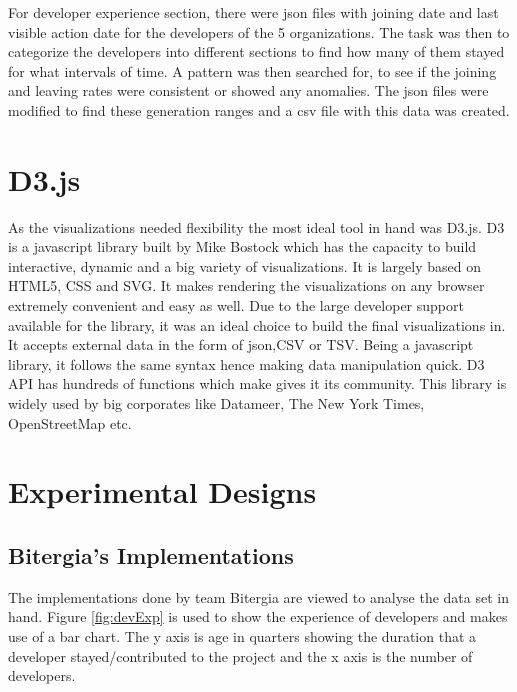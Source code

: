 \documentclass[seploa]{beavtex}
\begin{document}
For developer experience section, there were json files with joining date and last visible action date for the developers of the 5 organizations. The task was then to categorize the developers into different sections to find how many of them stayed for what intervals of time. A pattern was then searched for, to see if the joining and leaving rates were consistent or showed any anomalies. The json files were modified to find these generation ranges and a csv file with this data was created.

\section{D3.js}
As the visualizations needed flexibility the most ideal tool in hand was D3.js. D3 is a javascript library built by Mike Bostock which has the capacity to build interactive, dynamic and a big variety of visualizations. It is largely based on HTML5, CSS and SVG. It makes rendering the visualizations on any browser extremely convenient and easy as well. Due to the large developer support available for the library, it was an ideal choice to build the final visualizations in. It accepts external data in the form of json,CSV or TSV. Being a javascript library, it follows the same syntax hence making data manipulation quick. D3 API has hundreds of functions which make gives it its community. This library is widely used by big corporates like Datameer, The New York Times, OpenStreetMap etc.

\section{Experimental Designs}

\subsection{Bitergia's Implementations}
The implementations done by team Bitergia are viewed to analyse the data set in hand. Figure \ref{fig:devExp} is used to show the experience of developers and makes use of a bar chart. The y axis is age in quarters showing the duration that a developer stayed/contributed to the project and the x axis is the number of developers.
\end{document}
